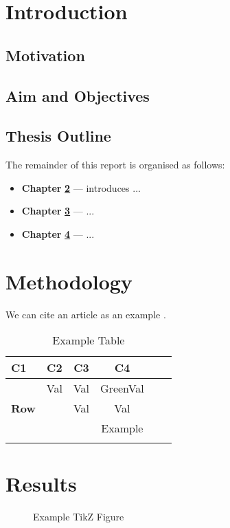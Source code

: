 \documentclass[12pt, a4paper]{report}
\begin{document}
\chapter{Introduction}
\section{Motivation}
\lipsum[1-3]
\section{Aim and Objectives}
\lipsum[6]
\section{Thesis Outline}
The remainder of this report is organised as follows:
\begin{itemize}
    \item[] \textbf{Chapter} \hyperref[Chap2]{\textbf{2}} --- introduces ...
    \item[] \textbf{Chapter} \hyperref[Chap3]{\textbf{3}} --- ...
    \item[] \textbf{Chapter} \hyperref[Chap4]{\textbf{4}} --- ...
\end{itemize}
\chapter{Methodology}
\label{Chap2}
We can cite an article as an example \cite{DeepMindRef}. \lipsum[4-8]
\begin{table}[H]
   \caption{Example Table}
   \small
   \centering
   \begin{tabular}{lccccr}
   \toprule[\heavyrulewidth]\toprule[\heavyrulewidth]
   \textbf{C1} & \textbf{C2} & \textbf{C3} & \textbf{C4}\\ 
   \midrule
\multirow{3}{*}{\textbf{Row}}& Val & Val & \textcolor{igreen}{GreenVal}\\
   & & Val  & \textcolor{igreen}{Val}\\
& &  & \textcolor{igreen}{Example}\\ \hdashline
   \bottomrule[\heavyrulewidth] 
   \end{tabular}
\end{table}


\chapter{Results}
\label{Chap3}
\lipsum[1-4]
\begin{figure}
    \centering
{}
\caption{Example TikZ Figure}
\end{figure}
\end{document}
